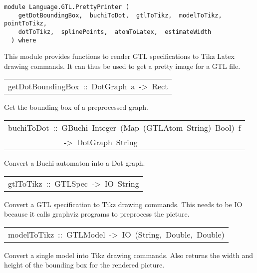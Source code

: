 \label{module:Language.GTL.PrettyPrinter}
\haddockbeginheader
{\haddockverb\begin{verbatim}
module Language.GTL.PrettyPrinter (
    getDotBoundingBox,  buchiToDot,  gtlToTikz,  modelToTikz,  pointToTikz, 
    dotToTikz,  splinePoints,  atomToLatex,  estimateWidth
  ) where\end{verbatim}}
\haddockendheader

This module provides functions to render GTL specifications to Tikz Latex drawing commands.
    It can thus be used to get a pretty image for a GTL file.
\par

\begin{haddockdesc}
\item[\begin{tabular}{@{}l}
getDotBoundingBox\ ::\ DotGraph\ a\ ->\ Rect
\end{tabular}]\haddockbegindoc
Get the bounding box of a preprocessed graph.
\par

\end{haddockdesc}
\begin{haddockdesc}
\item[\begin{tabular}{@{}l}
buchiToDot\ ::\ GBuchi\ Integer\ (Map\ (GTLAtom\ String)\ Bool)\ f\\\ \ \ \ \ \ \ \ \ \ \ \ \ \ ->\ DotGraph\ String
\end{tabular}]\haddockbegindoc
Convert a Buchi automaton into a Dot graph.
\par

\end{haddockdesc}
\begin{haddockdesc}
\item[\begin{tabular}{@{}l}
gtlToTikz\ ::\ GTLSpec\ ->\ IO\ String
\end{tabular}]\haddockbegindoc
Convert a GTL specification to Tikz drawing commands.
   This needs to be IO because it calls graphviz programs to preprocess the picture.
\par

\end{haddockdesc}
\begin{haddockdesc}
\item[\begin{tabular}{@{}l}
modelToTikz\ ::\ GTLModel\ ->\ IO\ (String,\ Double,\ Double)
\end{tabular}]\haddockbegindoc
Convert a single model into Tikz drawing commands.
   Also returns the width and height of the bounding box for the rendered picture.
\par

\end{haddockdesc}
